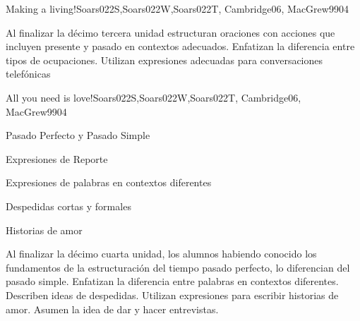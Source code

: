 \begin{syllabus}
\begin{unit}{Making a living!}{Soars022S,Soars022W,Soars022T, Cambridge06, MacGrew99}{0}{4}
   \begin{learningoutcomes}
      \item Al finalizar la décimo tercera unidad estructuran oraciones con acciones que incluyen presente y pasado en contextos adecuados. Enfatizan la diferencia entre tipos de ocupaciones. Utilizan expresiones adecuadas para conversaciones telefónicas
   \end{learningoutcomes}
\end{unit}

\begin{unit}{All you need is love!}{Soars022S,Soars022W,Soars022T, Cambridge06, MacGrew99}{0}{4}
   \begin{topics}
      \item Pasado Perfecto y Pasado Simple
      \item Expresiones de Reporte
      \item Expresiones de palabras en contextos diferentes 
      \item Despedidas cortas y formales 
      \item Historias de amor
   \end{topics}

   \begin{learningoutcomes}
      \item Al finalizar la décimo cuarta unidad, los alumnos habiendo conocido los fundamentos de la estructuración del tiempo pasado perfecto, lo diferencian del pasado simple. Enfatizan la diferencia entre palabras en contextos diferentes. Describen ideas de despedidas. Utilizan expresiones para escribir historias de amor. Asumen la idea de dar y hacer entrevistas.
   \end{learningoutcomes}
\end{unit}



\begin{coursebibliography}
\end{coursebibliography}

\end{syllabus}
%
